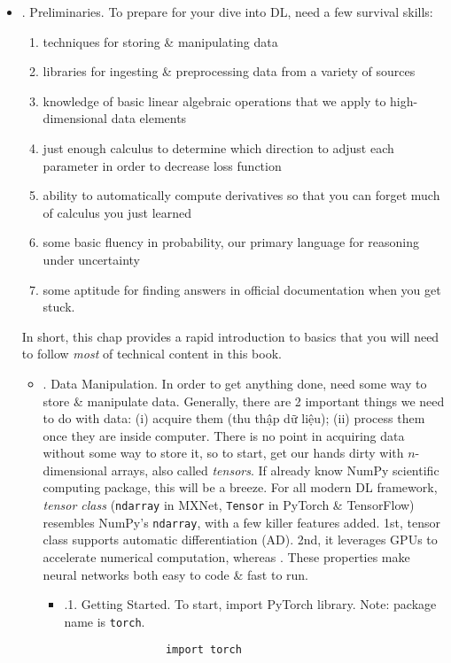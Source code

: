 \documentclass{article}
\begin{document}
\begin{itemize}
	\item {. Preliminaries.} To prepare for your dive into DL, need a few survival skills:
	\begin{enumerate}
		\item techniques for storing \& manipulating data
		\item libraries for ingesting \& preprocessing data from a variety of sources
		\item knowledge of basic linear algebraic operations that we apply to high-dimensional data elements
		\item just enough calculus to determine which direction to adjust each parameter in order to decrease loss function
		\item ability to automatically compute derivatives so that you can forget much of calculus you just learned
		\item some basic fluency in probability, our primary language for reasoning under uncertainty
		\item some aptitude for finding answers in official documentation when you get stuck.
	\end{enumerate}
	In short, this chap provides a rapid introduction to basics that you will need to follow {\it most} of technical content in this book.
	\begin{itemize}
		\item {. Data Manipulation.} In order to get anything done, need some way to store \& manipulate data. Generally, there are 2 important things we need to do with data: (i) acquire them (thu thập dữ liệu); (ii) process them once they are inside computer. There is no point in acquiring data without some way to store it, so to start, get our hands dirty with $n$-dimensional arrays, also called {\it tensors}. If already know NumPy scientific computing package, this will be a breeze. For all modern DL framework, {\it tensor class} ({\tt ndarray} in MXNet, {\tt Tensor} in PyTorch \& TensorFlow) resembles NumPy's {\tt ndarray}, with a few killer features added. 1st, tensor class supports automatic differentiation (AD). 2nd, it leverages GPUs to accelerate numerical computation, whereas . These properties make neural networks both easy to code \& fast to run.
		\begin{itemize}
			\item {.1. Getting Started.} To start, import PyTorch library. Note: package name is {\tt torch}.
			\begin{verbatim}
				import torch
			\end{verbatim}

\end{itemize}
\end{itemize}
\end{itemize}
\end{document}
